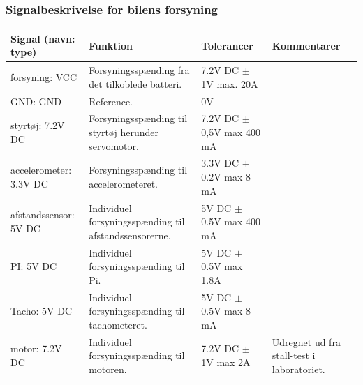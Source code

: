 \subsubsection{Signalbeskrivelse for bilens forsyning}

\begin{table}[h]
	\centering
	\begin{tabularx}{\textwidth}{|l|X|X|X|} \hline
	\textbf{Signal (navn: type)} & \textbf{Funktion} & \textbf{Tolerancer} & \textbf{Kommentarer} \\ \hline
forsyning: VCC
	& Forsyningsspænding fra det tilkoblede batteri. 
	& 7.2V DC $\pm$ 1V max. 20A
 	& ~
	\\ \hline
	
GND: GND
	& Reference. 
	& 0V
 	& ~
	\\ \hline
	
styrtøj: 7.2V DC
	& Forsyningsspænding til styrtøj herunder servomotor. 
	& 7.2V DC $\pm$ 0,5V max 400 mA\cite{lib:servo}
 	& ~
	\\ \hline
	
accelerometer: 3.3V DC
	& Forsyningsspænding til accelerometeret.
	& 3.3V DC $\pm$ 0.2V max 8 mA\cite{lib:accel}
 	& ~
	\\ \hline
	
afstandssensor: 5V DC
	& Individuel forsyningsspænding til afstandssensorerne.
	& 5V DC $\pm$ 0.5V max 400 mA\cite{lib:maxsonar}
 	& ~
	\\ \hline
	
PI: 5V DC
	& Individuel forsyningsspænding til Pi.
	& 5V DC $\pm$ 0.5V max 1.8A\cite{lib:PIPSU}
 	& ~
	\\ \hline
	
Tacho: 5V DC
	& Individuel forsyningsspænding til tachometeret.
	& 5V DC $\pm$ 0.5V max 8 mA\cite{lib:tacho}
 	& ~
	\\ \hline
	
motor: 7.2V DC
	& Individuel forsyningsspænding til motoren.
	& 7.2V DC $\pm$ 1V max 2A

 	& Udregnet ud fra stall-test i laboratoriet.
	\\ \hline
	\end{tabularx}
	\label{tbl:bil_forsyninger}
\end{table}
\clearpage

\clearpage

\clearpage

\clearpage

\clearpage

